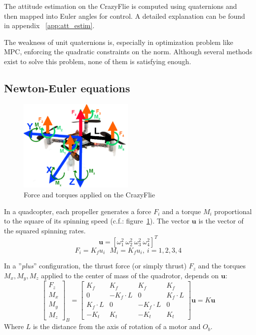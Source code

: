 \documentclass[a4paper, 12pt]{report}
\begin{document}
The attitude estimation on the CrazyFlie is computed using quaternions and then mapped into Euler angles for control. A detailed explanation can be found in appendix ~\ref{app:att_estim}.

The weakness of unit quaternions is, especially in optimization problem like MPC, enforcing the quadratic constraints on the norm. Although several methods exist to solve this problem, none of them is satisfying enough.
\subsection{Newton-Euler equations}
\label{sec:dynamicsEquations}

\begin{figure}[htbp]
\centering
\includegraphics[width=0.5\textwidth]{Images/forceMoments}
\caption{Force and torques applied on the CrazyFlie}
\label{fig:forceMoment}
\end{figure}

In a quadcopter, each propeller generates a force $F_i$ and a torque $M_i$ proportional to the square of its spinning speed  (c.f.: figure~\ref{fig:forceMoment}). The vector $\boldsymbol{u}$ is the vector of the squared spinning rates.
\[ \boldsymbol{u} = [\omega^2_1 \  \omega^2_2 \  \omega^2_3 \  \omega^2_4]^T \]
\[F_i =  K_f  u_i \ \ \ M_i = K_f  u_i  ,\  i = 1,2,3,4\]

In a ''\emph{plus}'' configuration, the thrust force (or simply thrust) $F_{z}$ and the torques $M_{x}, M_{y}, M_{z}$  applied to the center of mass of the quadrotor, depends on $\boldsymbol{u}$:
\[  
\begin{bmatrix}
F_{z}\\ 
M_{x}\\
M_{y}\\
M_{z}
 \end{bmatrix}_B
=
\begin{bmatrix}
K_f & K_f & K_f & K_f\\
0 & -K_f \cdot L & 0 & K_f \cdot L\\
K_f \cdot L & 0 & -K_f \cdot L & 0\\
-K_t & K_t & -K_t & K_t
\end{bmatrix}
\textbf{u} = K\textbf{u}
\]
Where $L$ is the distance from the axis of rotation of a motor and $O_b$.
\end{document}
